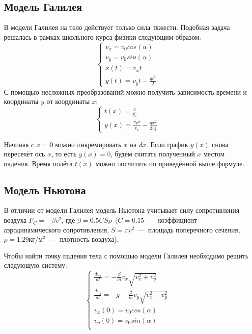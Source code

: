 \documentclass[12pt,a4paper,oneside]{extarticle}
\begin{document}
    \subsection{Модель Галилея}
        В модели Галилея на тело действует только сила тяжести. Подобная задача решалась в рамках школьного курса физики следующим образом:
        \begin{equation*}
            \begin{cases}
                v_x = v_0cos(\alpha) \\
                v_y = v_0sin(\alpha) \\
                x(t)=v_xt \\
                y(t)=v_yt - \frac{gt^2}{2}
            \end{cases}
        \end{equation*}
        С помощью несложных преобразований можно получить зависимость времени и координаты $y$ от координаты $x$:
        \begin{equation*}
            \begin{cases}
                t(x) = \frac{x}{v_x} \\
                y(x) = \frac{v_y x}{v_x} - \frac{gx^2}{2v_x^2}
            \end{cases}
        \end{equation*}

        Начиная c $x=0$ можно инкремировать $x$ на $dx$. Если график $y(x)$ снова пересечёт ось $x$, то есть $y(x)=0$, будем считать полученный $x$ местом падения. Время полёта $t(x)$ можно посчитать по приведённой выше формуле.

    \subsection{Модель Ньютона}
        В отличии от модели Галилея модель Ньютона учитывает силу сопротивления воздуха $F_C = -\beta v^2$, где $\beta=0.5CS\rho$~($C=0.15$~---~коэффициент аэродинамического сопротивления, $S=\pi r^2$~---~площадь поперечного сечения, $\rho=1.29$кг$/$м$^3$~---~плотность воздуха).

        Чтобы найти точку падения тела с помощью модели Галилея необходимо рещить следующую систему:
        \begin{equation*}
            \begin{cases}
                \frac{d v_x}{dt} = -\frac{\beta}{m}v_x \sqrt{v_x^2+v_y^2} \\
                \frac{d v_y}{dt} = -g-\frac{\beta}{m}v_y \sqrt{v_x^2+v_y^2} \\
                v_x(0) = v_0cos(\alpha) \\
                v_y(0) = v_0sin(\alpha) \\
            \end{cases}
        \end{equation*}
        
\end{document}
